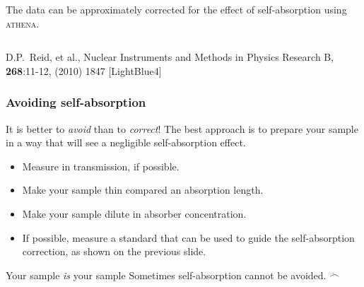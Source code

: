 \documentclass[10pt, xcolor=x11names, compress]{beamer}
\begin{document}
\begin{frame}
\begin{columns}[T]
\begin{column}{0.5\linewidth}
\begin{center}
        The data can be approximately corrected for the effect of
        self-absorption using \textsc{athena}.
      \end{center}
    \end{column}
  \end{columns}
  \begin{bottomnote}[0.5][19.5]
    D.P.\ Reid, et al., Nuclear Instruments and Methods in Physics
    Research B, \textbf{268}:11-12, (2010) 1847
    [LightBlue4]
  \end{bottomnote}
\end{frame}

\begin{frame}[label=selfabs]
  \frametitle{Avoiding self-absorption}
  \begin{alertblock}{It is better to \textit{avoid} than to \textit{correct}!}
    The best approach is to prepare your sample in a way that will see
    a negligible self-absorption effect.
  \end{alertblock}

  \begin{itemize}
  \item Measure in transmission, if possible.
  \item Make your sample thin compared an absorption length.
  \item Make your sample dilute in absorber concentration.
  \item If possible, measure a standard that can be used to guide the
    self-absorption correction, as shown on the previous slide.
  \end{itemize}

  \begin{block}{Your sample \textit{is} your sample}
    Sometimes self-absorption cannot be avoided. $\ddot\frown$
  \end{block}
\end{frame}
\end{document}
